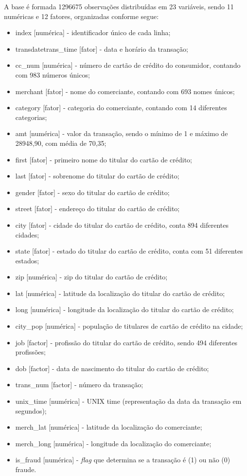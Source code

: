 \documentclass{article}
\begin{document}
A base é formada 1296675 observações distribuídas em 23 variáveis, sendo 11 numéricas e 12 fatores, organizadas conforme segue:

\begin{itemize}
    \item index [numérica] - identificador único de cada linha;
    \item transdatetrans\_time [fator] - data e horário da transação;
    \item cc\_num [numérica] - número de cartão de crédito do consumidor, contando com 983 números únicos;
    \item merchant [fator] - nome do comerciante, contando com 693 nomes únicos;
    \item category [fator] - categoria do comerciante, contando com 14 diferentes categorias;
    \item amt [numérica] - valor da transação, sendo o mínimo de 1 e máximo de 28948,90, com média de 70,35;
    \item first [fator] - primeiro nome do titular do cartão de crédito;
    \item last [fator] - sobrenome do titular do cartão de crédito;
    \item gender [fator] - sexo do titular do cartão de crédito;
    \item street [fator] - endereço do titular do cartão de crédito;
    \item city [fator] - cidade do titular do cartão de crédito, conta 894 diferentes cidades;
    \item state [fator] - estado do titular do cartão de crédito, conta com 51 diferentes estados;
    \item zip [numérica] - zip do titular do cartão de crédito;
    \item lat [numérica] - latitude da localização do titular do cartão de crédito;
    \item long [numérica] - longitude da localização do titular do cartão de crédito;
    \item city\_pop [numérica] - população de titulares de cartão de crédito na cidade;
    \item job [factor] - profissão do titular do cartão de crédito, sendo 494 diferentes profissões;
    \item dob [factor] - data de nascimento do titular do cartão de crédito;
    \item trans\_num [factor] - número da transação;
    \item unix\_time [numérica] - UNIX time (representação da data da transação em segundos);
    \item merch\_lat [numérica] - latitude da localização do comerciante;
    \item merch\_long [numérica] - longitude da localização do comerciante;
    \item is\_fraud [numérica] - \textit{flag} que determina se a transação é (1) ou não (0) fraude. 
\end{itemize}
\end{document}

